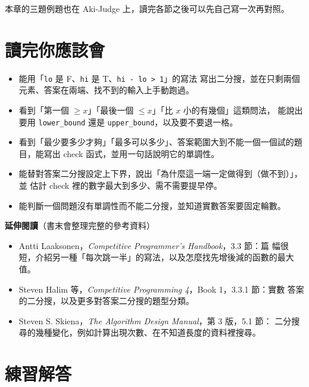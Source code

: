 本章的三題例題也在 Aki-Judge 上，讀完各節之後可以先自己寫一次再對照。

\section{讀完你應該會}
\label{sec:ch3-checklist}

\begin{itemize}
\item 能用「\texttt{lo} 是 F、\texttt{hi} 是 T、\texttt{hi - lo > 1}」的寫法
寫出二分搜，並在只剩兩個元素、答案在兩端、找不到的輸入上手動跑過。
\item 看到「第一個 $\ge x$」「最後一個 $\le x$」「比 $x$ 小的有幾個」這類問法，
能說出要用 \texttt{lower\_bound} 還是 \texttt{upper\_bound}，以及要不要退一格。
\item 看到「最少要多少才夠」「最多可以多少」、答案範圍大到不能一個一個試的題
目，能寫出 check 函式，並用一句話說明它的單調性。
\item 能替對答案二分搜設定上下界，說出「為什麼這一端一定做得到（做不到）」，並
估計 check 裡的數字最大到多少、需不需要提早停。
\item 能判斷一個問題沒有單調性而不能二分搜，並知道實數答案要固定輪數。
\end{itemize}

\textbf{延伸閱讀}（書末會整理完整的參考資料）

\begin{itemize}
\item Antti Laaksonen，\textit{Competitive Programmer's Handbook}，3.3 節：篇
幅很短，介紹另一種「每次跳一半」的寫法，以及怎麼找先增後減的函數的最大值。
\item Steven Halim 等，\textit{Competitive Programming 4}，Book 1，3.3.1 節：實數
答案的二分搜，以及更多對答案二分搜的題型分類。
\item Steven S. Skiena，\textit{The Algorithm Design Manual}，第 3 版，5.1 節：
二分搜尋的幾種變化，例如計算出現次數、在不知道長度的資料裡搜尋。
\end{itemize}

\section*{練習解答}

